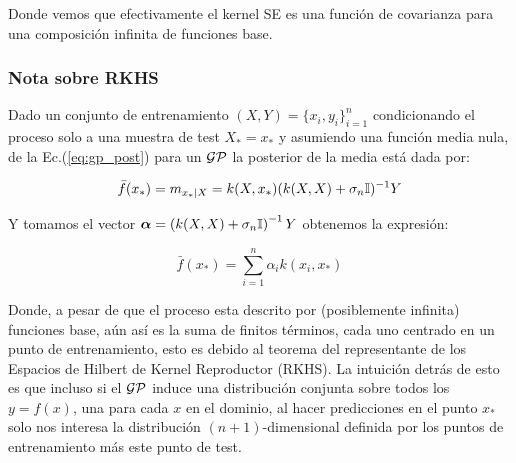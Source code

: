 Donde vemos que efectivamente el kernel SE es una función de covarianza para una composición infinita de funciones base.

\subsubsection{Nota sobre RKHS}
Dado un conjunto de entrenamiento $(X, Y) = \{x_i, y_i \}_{i=1}^{n}$ condicionando el proceso solo a una muestra de test $X_*=x_*$ y asumiendo una función media nula, de la Ec.(\ref{eq:gp_post}) para un $\mathcal{GP}$ la posterior de la media está dada por:

\begin{equation}
	\bar{f}(x_*) = m_{x_*|X} = k(X, x_*) (k(X, X) + \sigma_n {\mathbb I})^{-1} Y
\end{equation}

Y tomamos el vector $\bm{\alpha} = \left(k(X, X) + \sigma_n {\mathbb I} \right)^{-1} Y$ obtenemos la expresión:

\begin{equation}
	\bar{f}(x_*) = \sum_{i=1}^{n} \alpha_i k(x_i, x_*)
\end{equation}

Donde, a pesar de que el proceso esta descrito por (posiblemente infinita) funciones base, aún así es la suma de finitos términos, cada uno centrado en un punto de entrenamiento, esto es debido al teorema del representante de los Espacios de Hilbert de Kernel Reproductor (RKHS). La intuición detrás de esto es que incluso si el $\mathcal{GP}$ induce una distribución conjunta sobre todos los $y = f(x)$, una para cada $x$ en el dominio, al hacer predicciones en el punto $x_*$ solo nos interesa la distribución $(n+1)$-dimensional definida por los puntos de entrenamiento más este punto de test.



